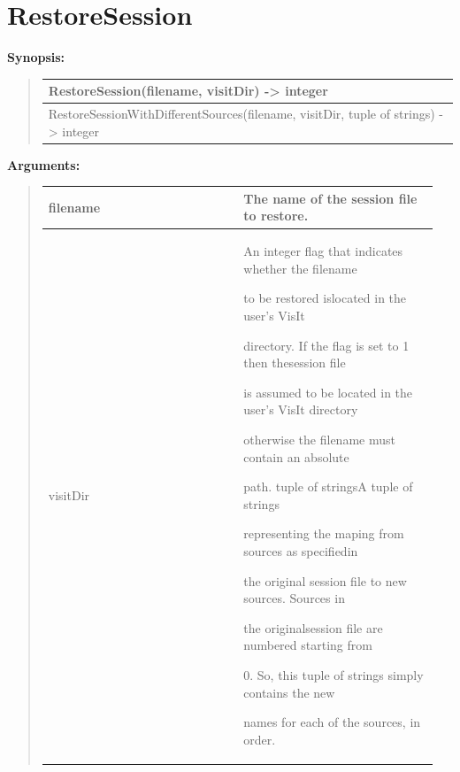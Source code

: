 \documentclass[letterpaper,10pt,english]{sphinxmanual}
\begin{document}
\section{RestoreSession}
\label{functions:restoresession}
\begin{DUlineblock}{0em}
\item[] \textbf{Synopsis:}
\end{DUlineblock}
\begin{quote}

\begin{tabulary}{\linewidth}{|L|}
\hline

RestoreSession(filename, visitDir) -\textgreater{} integer
\\
\hline
RestoreSessionWithDifferentSources(filename, visitDir, tuple of strings) -\textgreater{} integer
\\
\hline\end{tabulary}

\end{quote}

\begin{DUlineblock}{0em}
\item[] 
\item[] \textbf{Arguments:}
\end{DUlineblock}
\begin{quote}

\begin{tabular}{|p{0.475\linewidth}|p{0.475\linewidth}|}
\hline

filename
 & 
The name of the session file to restore.
\\
\hline
visitDir
 & 
\begin{DUlineblock}{0em}
\item[] An integer flag that indicates whether the filename
\item[] to be restored islocated in the user's VisIt
\item[] directory. If the flag is set to 1 then thesession file
\item[] is assumed to be located in the user's VisIt directory
\item[] otherwise the filename must contain an absolute
\item[] path. tuple of stringsA tuple of strings
\item[] representing the maping from sources as specifiedin
\item[] the original session file to new sources. Sources in
\item[] the originalsession file are numbered starting from
\item[] 0. So, this tuple of strings simply contains the new
\item[] names for each of the sources, in order.
\end{DUlineblock}
\\
\hline\end{tabular}

\end{quote}
\end{document}
